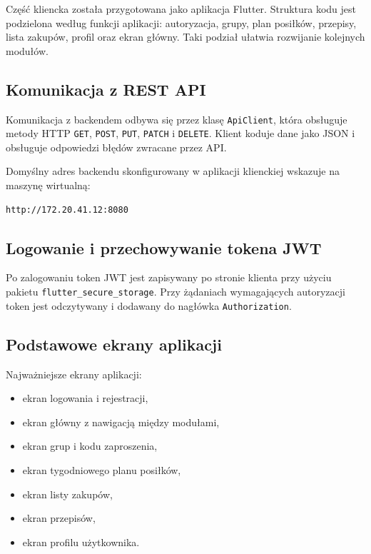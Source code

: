 \documentclass[12pt,a4paper]{article}
\begin{document}
Część kliencka została przygotowana jako aplikacja Flutter. Struktura kodu jest podzielona według funkcji aplikacji: autoryzacja, grupy, plan posiłków, przepisy, lista zakupów, profil oraz ekran główny. Taki podział ułatwia rozwijanie kolejnych modułów.

\subsection{Komunikacja z REST API}

Komunikacja z backendem odbywa się przez klasę \texttt{ApiClient}, która obsługuje metody HTTP \texttt{GET}, \texttt{POST}, \texttt{PUT}, \texttt{PATCH} i \texttt{DELETE}. Klient koduje dane jako JSON i obsługuje odpowiedzi błędów zwracane przez API.

Domyślny adres backendu skonfigurowany w aplikacji klienckiej wskazuje na maszynę wirtualną:

\begin{lstlisting}[style=terminal]
http://172.20.41.12:8080
\end{lstlisting}

\subsection{Logowanie i przechowywanie tokena JWT}

Po zalogowaniu token JWT jest zapisywany po stronie klienta przy użyciu pakietu \texttt{flutter\_secure\_\allowbreak storage}. Przy żądaniach wymagających autoryzacji token jest odczytywany i dodawany do nagłówka \texttt{Authorization}.

\subsection{Podstawowe ekrany aplikacji}

Najważniejsze ekrany aplikacji:

\begin{itemize}
    \item ekran logowania i rejestracji,
    \item ekran główny z nawigacją między modułami,
    \item ekran grup i kodu zaproszenia,
    \item ekran tygodniowego planu posiłków,
    \item ekran listy zakupów,
    \item ekran przepisów,
    \item ekran profilu użytkownika.
\end{itemize}
\end{document}
